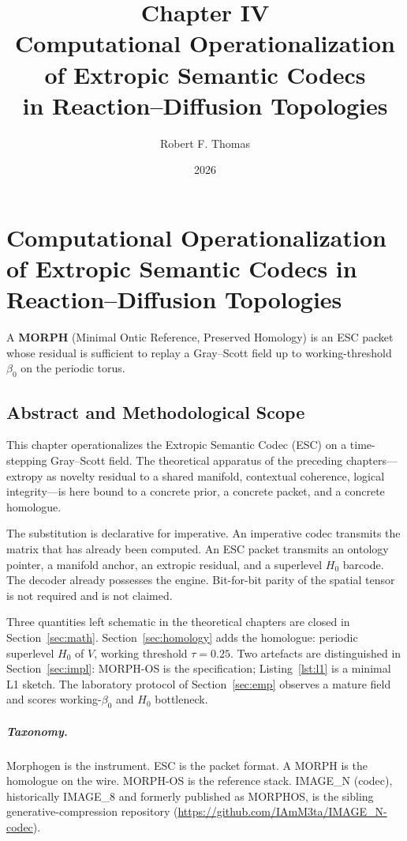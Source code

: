 \documentclass[12pt,oneside]{book}
\title{Chapter IV\\[0.4em]
\large Computational Operationalization of Extropic Semantic Codecs\\
in Reaction--Diffusion Topologies}
\author{Robert F. Thomas}
\date{2026}
\begin{document}
\frontmatter
\maketitle
\tableofcontents
\mainmatter

\chapter{Computational Operationalization of Extropic Semantic Codecs
in Reaction--Diffusion Topologies}

A \textbf{MORPH} (Minimal Ontic Reference, Preserved Homology) is an
ESC packet whose residual is sufficient to replay a Gray--Scott field
up to working-threshold $\beta_0$ on the periodic torus.

\section{Abstract and Methodological Scope}
\label{sec:scope}

This chapter operationalizes the Extropic Semantic Codec (ESC) on a
time-stepping Gray--Scott field. The theoretical apparatus of the
preceding chapters---extropy as novelty residual to a shared manifold,
contextual coherence, logical integrity---is here bound to a concrete
prior, a concrete packet, and a concrete homologue.

The substitution is declarative for imperative. An imperative codec
transmits the matrix that has already been computed. An ESC packet
transmits an ontology pointer, a manifold anchor, an extropic residual,
and a superlevel $H_0$ barcode. The decoder already possesses the
engine. Bit-for-bit parity of the spatial tensor is not required and is
not claimed.

Three quantities left schematic in the theoretical chapters are closed
in Section~\ref{sec:math}. Section~\ref{sec:homology} adds the
homologue: periodic superlevel $H_0$ of $V$, working threshold
$\tau=0.25$. Two artefacts are distinguished in Section~\ref{sec:impl}:
MORPH-OS is the specification; Listing~\ref{lst:l1} is a minimal L1
sketch. The laboratory protocol of Section~\ref{sec:emp} observes a
mature field and scores working-$\beta_0$ and $H_0$ bottleneck.

\paragraph{Taxonomy.}
Morphogen is the instrument. ESC is the packet format. A MORPH is the
homologue on the wire. MORPH-OS is the reference stack. IMAGE\_N
(codec), historically IMAGE\_8 and formerly published as MORPHOS, is
the sibling generative-compression repository
(\url{https://github.com/IAmM3ta/IMAGE_N-codec}).
\end{document}

